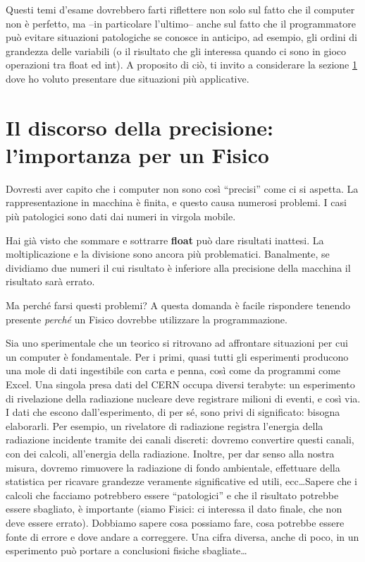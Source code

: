	Questi temi d'esame dovrebbero farti riflettere non solo sul fatto che il computer non è perfetto, ma --in particolare l'ultimo-- anche sul fatto che il programmatore può evitare situazioni patologiche se conosce in anticipo, ad esempio, gli ordini di grandezza delle variabili (o il risultato che gli interessa quando ci sono in gioco operazioni tra float ed int). A proposito di ciò, ti invito a considerare la sezione  \ref{precfis} dove ho voluto presentare due situazioni più applicative. 
	\section{Il discorso della precisione: l'importanza per un Fisico}\label{precfis}
	Dovresti aver capito che i computer non sono così ``precisi'' come ci si aspetta. La rappresentazione in macchina è finita, e questo causa numerosi problemi. I casi più patologici sono dati dai numeri in virgola mobile. 
	
	Hai già visto che sommare e sottrarre \textbf{float} può dare risultati inattesi. La moltiplicazione e la divisione sono ancora più problematici. Banalmente, se dividiamo due numeri il cui risultato è inferiore alla precisione della macchina il risultato sarà errato. 
	
	Ma perché farsi questi problemi? A questa domanda è facile rispondere tenendo presente \emph{perché} un Fisico dovrebbe utilizzare la programmazione.
	
	Sia uno sperimentale che un teorico si ritrovano ad affrontare situazioni per cui un computer è fondamentale. Per i primi, quasi tutti gli esperimenti producono una mole di dati ingestibile con carta e penna, così come da programmi come Excel. Una singola presa dati del CERN occupa diversi terabyte: un esperimento di rivelazione della radiazione nucleare deve registrare milioni di eventi, e così via. I dati che escono dall'esperimento, di per sé, sono privi di significato: bisogna elaborarli. Per esempio, un rivelatore di radiazione registra l'energia della radiazione incidente tramite dei canali discreti: dovremo convertire questi canali, con dei calcoli, all'energia della radiazione. Inoltre, per dar senso alla nostra misura, dovremo rimuovere la radiazione di fondo ambientale, effettuare della statistica per ricavare grandezze veramente significative ed utili, ecc\ldots Sapere che i calcoli che facciamo potrebbero essere ``patologici'' e che il risultato potrebbe essere sbagliato, è importante (siamo Fisici: ci interessa il dato finale, che non deve essere errato). Dobbiamo sapere cosa possiamo fare, cosa potrebbe essere fonte di errore e dove andare a correggere. Una cifra diversa, anche di poco, in un esperimento può portare a conclusioni fisiche sbagliate\ldots
	
